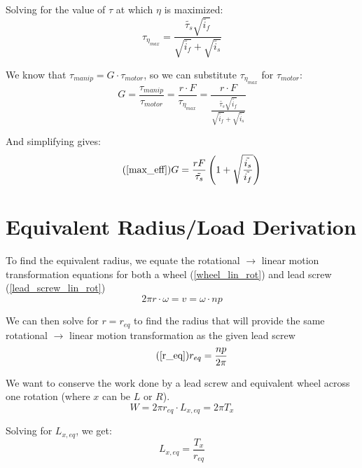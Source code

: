 \documentclass[11pt,a4paper,titlepage]{article}
\begin{document}
	Solving for the value of $\tau$ at which $\eta$ is maximized:
	\begin{equation}
		\tau_{\eta_{max}} = \frac{\tilde{\tau_s} \sqrt{\tilde{i_f}}}{\sqrt{\tilde{i_f}} + \sqrt{\tilde{i_s}}}
	\end{equation}
	
	We know that $\tau_{manip} = G \cdot \tau_{motor}$, so we can substitute $\tau_{\eta_{max}}$ for $\tau_{motor}$:
	\begin{equation}
		G = \frac{\tau_{manip}}{\tau_{motor}} = \frac{r \cdot F}{\tau_{\eta_{max}}} = \frac{r \cdot F}{\frac{\tilde{\tau_s} \sqrt{\tilde{i_f}}}{\sqrt{\tilde{i_f}} + \sqrt{\tilde{i_s}}}}
	\end{equation}
	
	And simplifying gives:
	\begin{equation} \tag{\ref*{max_eff}}
		G = \frac{r F}{\tilde{\tau_s}} \left( 1 + \sqrt{\frac{\tilde{i_s}}{\tilde{i_f}}} \right)
	\end{equation}
	
	\bigskip
	\section{Equivalent Radius/Load Derivation} \label{appendixB}
	To find the equivalent radius, we equate the rotational $\to$ linear motion transformation equations for both a wheel (\ref{wheel_lin_rot}) and lead screw (\ref{lead_screw_lin_rot})
	\begin{equation}
		2 \pi r \cdot \omega = v = \omega \cdot n p
	\end{equation}
	
	We can then solve for $r = r_{eq}$ to find the radius that will provide the same rotational $\to$ linear motion transformation as the given lead screw
	\begin{equation} \tag{\ref*{r_eq}}
		r_{eq} = \frac{n p}{2 \pi}
	\end{equation}
	
	We want to conserve the work done by a lead screw and equivalent wheel across one rotation (where $x$ can be $L$ or $R$). 
	\begin{equation}
		W = 2 \pi r_{eq} \cdot L_{x,eq} = 2 \pi T_x
	\end{equation}
	
	Solving for $L_{x,eq}$, we get:
	\begin{equation}
		L_{x,eq} = \frac{T_x}{r_{eq}}
	\end{equation}
	
	\newpage
\end{document}
